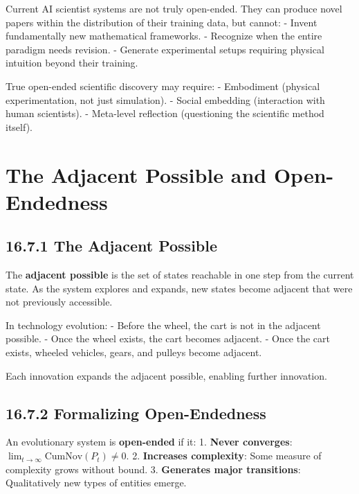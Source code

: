 \begin{conjecture}
Current AI scientist systems are not truly open-ended. They can produce novel papers within the distribution of their training data, but cannot:
- Invent fundamentally new mathematical frameworks.
- Recognize when the entire paradigm needs revision.
- Generate experimental setups requiring physical intuition beyond their training.

True open-ended scientific discovery may require:
- Embodiment (physical experimentation, not just simulation).
- Social embedding (interaction with human scientists).
- Meta-level reflection (questioning the scientific method itself).
\end{conjecture}



\section{The Adjacent Possible and Open-Endedness}

\subsection{16.7.1 The Adjacent Possible}

\begin{definition}
The \textbf{adjacent possible} is the set of states reachable in one step from the current state. As the system explores and expands, new states become adjacent that were not previously accessible.
\end{definition}

\begin{example}
In technology evolution:
- Before the wheel, the cart is not in the adjacent possible.
- Once the wheel exists, the cart becomes adjacent.
- Once the cart exists, wheeled vehicles, gears, and pulleys become adjacent.

Each innovation expands the adjacent possible, enabling further innovation.
\end{example}

\subsection{16.7.2 Formalizing Open-Endedness}

\begin{definition}
An evolutionary system is \textbf{open-ended} if it:
1. \textbf{Never converges}: $\lim_{t \to \infty} \mathrm{CumNov}(P_t) \neq 0$.
2. \textbf{Increases complexity}: Some measure of complexity grows without bound.
3. \textbf{Generates major transitions}: Qualitatively new types of entities emerge.
\end{definition}

